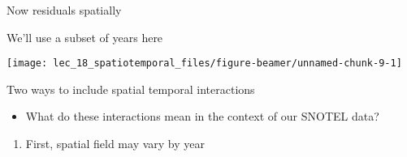 \documentclass[ignorenonframetext,]{beamer}
\newenvironment{Shaded}{\begin{snugshade}}{\end{snugshade}}
\newcommand{\DataTypeTok}[1]{\textcolor[rgb]{0.13,0.29,0.53}{#1}}
\newcommand{\KeywordTok}[1]{\textcolor[rgb]{0.13,0.29,0.53}{\textbf{#1}}}
\newcommand{\NormalTok}[1]{#1}
\newcommand{\OperatorTok}[1]{\textcolor[rgb]{0.81,0.36,0.00}{\textbf{#1}}}
\newcommand{\StringTok}[1]{\textcolor[rgb]{0.31,0.60,0.02}{#1}}
\providecommand{\tightlist}{%
  \setlength{\itemsep}{0pt}\setlength{\parskip}{0pt}}
\begin{document}
\begin{frame}{Now residuals spatially}
\protect\hypertarget{now-residuals-spatially}{}

We'll use a subset of years here

\begin{center}\texttt{[image: lec\_18\_spatiotemporal\_files/figure-beamer/unnamed-chunk-9-1]} \end{center}

\end{frame}

\begin{frame}[fragile]{Two ways to include spatial temporal
interactions}
\protect\hypertarget{two-ways-to-include-spatial-temporal-interactions}{}

\begin{itemize}
\tightlist
\item
  What do these interactions mean in the context of our SNOTEL data?
\end{itemize}

\begin{enumerate}
\tightlist
\item
  First, spatial field may vary by year
\end{enumerate}

\begin{Shaded}
\end{Shaded}

\end{frame}
\end{document}
